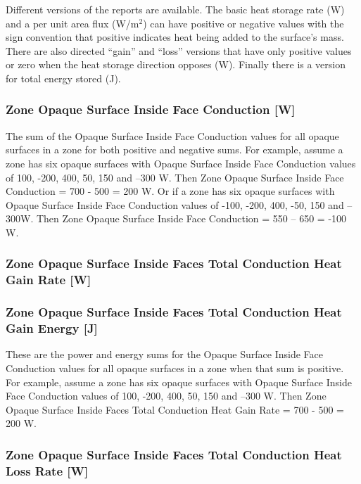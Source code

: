 Different versions of the reports are available. The basic heat storage rate (W) and a per unit area flux (W/m\(^{2}\)) can have positive or negative values with the sign convention that positive indicates heat being added to the surface's mass. There are also directed ``gain'' and ``loss'' versions that have only positive values or zero when the heat storage direction opposes (W). Finally there is a version for total energy stored (J).

\subsubsection{Zone Opaque Surface Inside Face Conduction {[}W{]}}\label{zone-opaque-surface-inside-face-conduction-w}

The sum of the Opaque Surface Inside Face Conduction values for all opaque surfaces in a zone for both positive and negative sums. For example, assume a zone has six opaque surfaces with Opaque Surface Inside Face Conduction values of 100, -200, 400, 50, 150 and --300 W. Then Zone Opaque Surface Inside Face Conduction = 700 - 500 = 200 W. Or if a zone has six opaque surfaces with Opaque Surface Inside Face Conduction values of -100, -200, 400, -50, 150 and --300W. Then Zone Opaque Surface Inside Face Conduction = 550 -- 650 = -100 W.

\subsubsection{Zone Opaque Surface Inside Faces Total Conduction Heat Gain Rate {[}W{]}}\label{zone-opaque-surface-inside-faces-total-conduction-heat-gain-rate-w}

\subsubsection{Zone Opaque Surface Inside Faces Total Conduction Heat Gain Energy {[}J{]}}\label{zone-opaque-surface-inside-faces-total-conduction-heat-gain-energy-j}

These are the power and energy sums for the Opaque Surface Inside Face Conduction values for all opaque surfaces in a zone when that sum is positive. For example, assume a zone has six opaque surfaces with Opaque Surface Inside Face Conduction values of 100, -200, 400, 50, 150 and --300 W. Then Zone Opaque Surface Inside Faces Total Conduction Heat Gain Rate = 700 - 500 = 200 W.

\subsubsection{Zone Opaque Surface Inside Faces Total Conduction Heat Loss Rate {[}W{]}}\label{zone-opaque-surface-inside-faces-total-conduction-heat-loss-rate-w}

